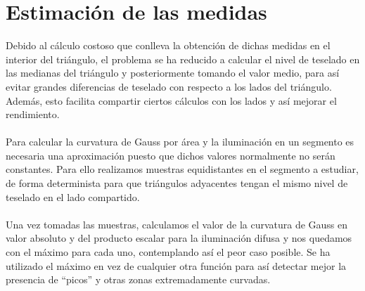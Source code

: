 \section{Estimación de las medidas}
	Debido al cálculo costoso que conlleva la obtención de dichas medidas en el interior del triángulo, el problema se ha reducido a calcular el nivel de teselado en las medianas del triángulo y posteriormente tomando el valor medio, para así evitar grandes diferencias de teselado con respecto a los lados del triángulo. Además, esto facilita compartir ciertos cálculos con los lados y así mejorar el rendimiento.\\
	\\Para calcular la curvatura de Gauss por área y la iluminación en un segmento es necesaria una aproximación puesto que dichos valores normalmente no serán constantes. Para ello realizamos muestras equidistantes en el segmento a estudiar, de forma determinista para que triángulos adyacentes tengan el mismo nivel de teselado en el lado compartido.\\
	\\Una vez tomadas las muestras, calculamos el valor de la curvatura de Gauss en valor absoluto y del producto escalar para la iluminación difusa y nos quedamos con el máximo para cada uno, contemplando así el peor caso posible. Se ha utilizado el máximo en vez de cualquier otra función para así detectar mejor la presencia de ``picos'' y otras zonas extremadamente curvadas.

\endinput
